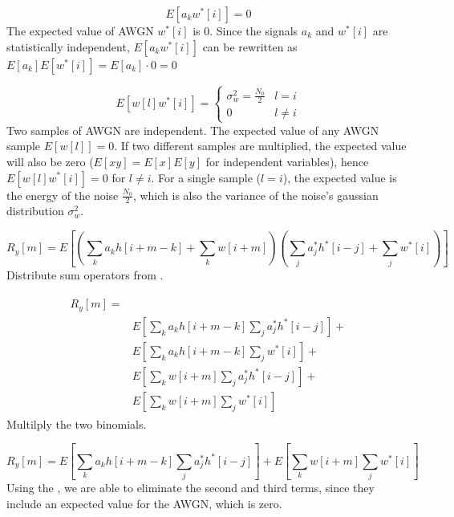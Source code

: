 \documentclass[11pt]{article}
\begin{document}
\begin{equation} \label{enoise_zero}
    E\left[a_k w^*[i]\right]= 0
\end{equation}
The expected value of AWGN $w^*[i]$ is $0$. Since the signals $a_k$ and $w^*[i]$
are statistically independent, $E\left[a_k w^*[i]\right]$ can be rewritten as
$E[a_k]E[w^*[i]] = E[a_k]\cdot 0 = 0$

\begin{equation}\label{noise_e}
    E \left[w[l]w^*[i]\right] =
    \begin{cases}
        \sigma^2_w = \frac{N_0}{2} & l = i    \\
        0                          & l \neq i
    \end{cases}
\end{equation}
Two samples of AWGN are independent. The expected value of any AWGN sample
$E[w[l]] = 0$. If two different samples are multiplied, the expected value will
also be zero ($E[xy] = E[x]E[y]$ for independent variables), hence
$E[w[l]w^*[i]] = 0$ for $l \neq i$. For a single sample ($l = i$), the expected
value is the energy of the noise $\frac{N_0}{2}$, which is also the variance of
the noise's gaussian distribution $\sigma_w^2$.

\begin{equation}
    R_y[m] = E\left[ \left( \sum_k a_k h[i+m-k] + \sum_k w[i+m] \right) \left(
        \sum_j a_j^* h^*[i-j] + \sum_j w^*[i] \right) \right]
\end{equation}
Distribute sum operators from .

\begin{align}
    \begin{split}
        R_y[m] = & \\
        & E\left[ \sum_k a_k h[i+m-k] \sum_j a_j^* h^*[i-j] \right] + \\
        & E\left[ \sum_k a_k h[i+m-k] \sum_j w^*[i] \right] +         \\
        & E\left[ \sum_k w[i+m] \sum_j a_j^* h^*[i-j] \right] +       \\
        & E\left[ \sum_k w[i+m] \sum_j w^*[i] \right]
    \end{split}
\end{align}
Multilply the two binomials.

\begin{equation}
    R_y[m] = E\left[ \sum_k a_k h[i+m-k] \sum_j a_j^* h^*[i-j] \right] + E\left[
        \sum_k w[i+m] \sum_j w^*[i] \right]
\end{equation}
Using the , we are able to eliminate the second and third
terms, since they include an expected value for the AWGN, which is zero.
\end{document}
